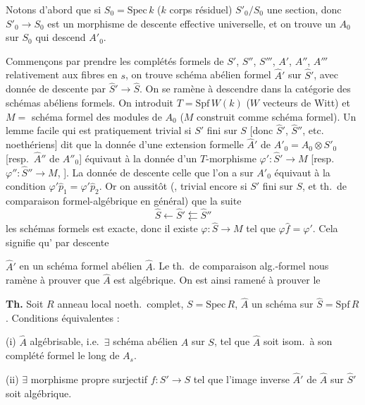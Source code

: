 \documentclass[11pt,a4paper]{article}
\begin{document}
Notons d'abord que si $S_0 = \mathrm{Spec}\,k$ ($k$ corps résiduel)
 $S'_0/S_0$  une section, donc $S'_0 \to S_0$ est un
morphisme de descente effective universelle, et on trouve un
$A_0$ sur $S_0$ qui descend $A'_0$.

Commençons par prendre les complétés formels de $S'$, $S''$, $S'''$, $A'$,
$A''$, $A'''$ relativement aux fibres en $s$, on trouve \struck{\ill{}}
schéma abélien formel $\hat{A}'$ sur $\hat{S}'$, avec donnée de descente
par $\hat{S}' \to \hat{S}$. On se ramène à descendre dans la catégorie des
schémas abéliens formels. On introduit $T = \mathrm{Spf}\,W(k)$ ($W$ vecteurs
de Witt) et $M =$ schéma formel des modules de $A_0$ ($M$ construit comme
schéma formel). Un lemme facile qui est pratiquement trivial si $S'$
fini sur $S$ [donc $\hat{S}'$, $\hat{S}''$, etc.\ 
  noethériens] dit que la donnée d'une extension formelle $\hat{A}'$
de $A'_0 = A_0 \otimes S'_0$ [resp.\ $\hat{A}''$ de $A''_0$] équivaut à la
donnée d'un $T$-morphisme $\varphi' : \hat{S}' \to M$ [resp.\
$\varphi'' : \hat{S}'' \to M$, ]. La donnée de
descente \add{sur $\hat{A}'$} \uncertain{prolongeant} celle que l'on a sur
$A'_0$ équivaut à la condition $\varphi' \hat{p}_1 = \varphi' \hat{p}_2$.
Or on \uncertain{a} aussitôt (\ill{}, trivial encore si $S'$
fini sur $S$, et  th.\ de comparaison
formel-algébrique en général) que la suite
\[
  \hat{S} \longleftarrow \hat{S}' \leftleftarrows \hat{S}''
\]
\struck{\ill{}}  les schémas formels est exacte, donc il
existe $\varphi : \hat{S} \to M$ tel que $\varphi \hat{f} = \varphi'$. Cela
signifie qu'\ill{} par descente

$\hat{A}'$ en un schéma formel abélien $\hat{A}$. Le th.\ de comparaison
alg.-formel nous ramène à prouver que $\hat{A}$ est algébrique. On est ainsi
ramené à prouver le

\textbf{Th.} Soit $R$ anneau local noeth.\ complet, $S = \mathrm{Spec}\,R$,
$\hat{A}$ un schéma \add{abélien formel} sur $\hat{S} =
\mathrm{Spf}\,R$. Conditions équivalentes :

(i) $\hat{A}$ algébrisable, i.e.\ $\exists$ schéma abélien $A$ sur $S$,
tel que $\hat{A}$ soit isom.\ à son complété formel \struck{\ill{}} le long de
$A_s$.

(ii) $\exists$ morphisme propre surjectif $f : S' \to S$ \struck{\ill{}}
tel que l'image inverse $\hat{A}'$ de $\hat{A}$ sur $\hat{S}'$ soit
algébrique.
\end{document}
